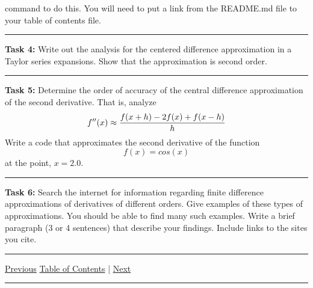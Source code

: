\documentclass[10pt,fleqn]{article}
\begin{document}
\begin{trivlist}
\begin{verbatim}
        \end{verbatim}
        command to do this. You will need to put a link from the README.md file
        to your table of contents file.
\vskip0.1in\hrule\vskip0.1in \noindent
  \item[\bf Task 4:] Write out the analysis for the centered difference
        approximation in a Taylor series expansions. Show that the approximation
        is second order.
\vskip0.1in\hrule\vskip0.1in \noindent
  \item[\bf Task 5:] Determine the order of accuracy of the central difference
        approximation of the second derivative. That is, analyze
        \[
          f''(x) \approx {{f(x+h) - 2 f(x) + f(x-h)}\over{h}}
        \]
        Write a code that approximates the second derivative of the function
        \[
          f(x) = cos(x)
        \] 
        at the point, \(x=2.0\).
\vskip0.1in\hrule\vskip0.1in \noindent
  \item[\bf Task 6:] Search the internet for information regarding finite
        difference approximations of derivatives of different orders. Give
        examples of these types of approximations. You should be able to find
        many such examples. Write a brief paragraph (3 or 4 sentences) that
        describe your findings. Include links to the sites you cite.
\end{trivlist}
\vskip0.1in\hrule\vskip0.1in \noindent
  \href{../../tasksheet_02/html/tasksheet_02.html}{Previous}
  \href{../../toc/md/tasksheet_toc.md}{Table of Contents} |
  \href{../../tasksheet_04/html/tasksheet_04.html}{Next}
\vskip0.1in\hrule\vskip0.1in \noindent
\end{document}
